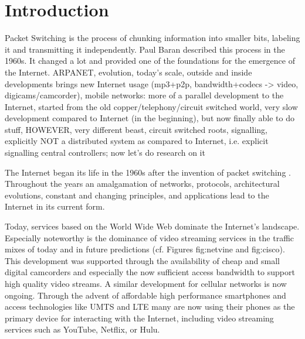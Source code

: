 \chapter{Introduction}

Packet Switching is the process of chunking information into smaller bits, labeling it and transmitting it independently. Paul Baran described this process in the 1960s\cite{baran1964distributed}. It changed a lot and provided one of the foundations for the emergence of the Internet. ARPANET, evolution, today's scale, outside and inside developments brings new Internet usage (mp3+p2p, bandwidth+codecs -> video, digicams/camcorder), mobile networks: more of a parallel development to the Internet, started from the old copper/telephony/circuit switched world, very slow development compared to Internet (in the beginning), but now finally able to do stuff, HOWEVER, very different beast, circuit switched roots, signalling, explicitly NOT a distributed system as compared to Internet, i.e. explicit signalling central controllers; now let's do research on it


The Internet began its life in the 1960s after the invention of packet switching \cite{baran1964distributed}. Throughout the years an amalgamation of networks, protocols, architectural evolutions, constant and changing principles, and applications lead to the Internet in its current form.

Today, services based on the World Wide Web dominate the Internet's landscape. Especially noteworthy is the dominance of video streaming services in the traffic mixes of today and in future predictions (cf. Figures fig:netvine and fig:cisco). This development was supported through the availability of cheap and small digital camcorders and especially the now sufficient access bandwidth to support high quality video streams.
A similar development for cellular networks is now ongoing. Through the advent of affordable high performance smartphones and access technologies like UMTS and LTE many are now using their phones as the primary device for interacting with the Internet, including video streaming services such as YouTube, Netflix, or Hulu.

